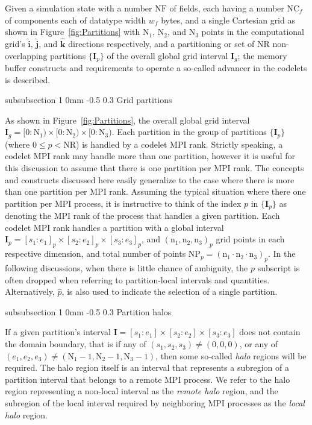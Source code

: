 \documentclass[11pt]{article}
\makeatletter
\renewcommand{\subsubsection}{\@startsection
{subsubsection}%
{1}%
{0mm}%
{-0.5\baselineskip}%
{0.3\baselineskip}%
{\normalfont\normalsize\itshape\centering\color{myBrown}}}%
\makeatother
\begin{document}
Given a simulation state with a number $\text{NF}$ of fields, each having a number $\text{NC}_f$ of components each of datatype width $w_f$ bytes, and a single Cartesian grid as shown in Figure~\ref{fig:Partitions} with $\text{N}_1$, $\text{N}_2$, and $\text{N}_3$ points in the computational grid's $\mathbf{\hat{i}}$, $\mathbf{\hat{j}}$, and $\mathbf{\hat{k}}$ directions respectively, and a partitioning or set of $\text{NR}$ non-overlapping partitions $\{\textbf{I}_p\}$ of the overall global grid interval $\textbf{I}_{g}$; the memory buffer constructs and requirements to operate a so-called advancer in the codelets is described. 

\subsubsection{Grid partitions}

As shown in Figure~\ref{fig:Partitions}, the overall global grid interval $\textbf{I}_{g} = [0:\text{N}_1)\times[0:\text{N}_2)\times[0:\text{N}_3)$. Each partition in the group of partitions $\{\textbf{I}_p\}$ (where $0 \leq p < \text{NR}$) is handled by a codelet MPI rank. Strictly speaking, a codelet MPI rank may handle more than one partition, however it is useful for this discussion to assume that there is one partition per MPI rank. The concepts and constructs discussed here easily generalize to the case where there is more than one partition per MPI rank. Assuming the typical situation where there one partition per MPI process, it is instructive to think of the index $p$ in $\{\textbf{I}_p\}$ as denoting the MPI rank of the process that handles a given partition.  Each codelet MPI rank handles a partition with a global interval $\textbf{I}_p = [s_1:e_1]_p\times[s_2:e_2]_p\times[s_3:e_3]_p$, and $(\text{n}_1,\text{n}_2,\text{n}_3)_p$ grid points in each respective dimension, and total number of points $\text{NP}_p = (\text{n}_1 \cdot \text{n}_2 \cdot \text{n}_3)_p$. In the following discussions, when there is little chance of ambiguity, the $p$ subscript is often dropped when referring to partition-local intervals and quantities. Alternatively, $\hat{p}$, is also used to indicate the selection of a single partition.

\subsubsection{Partition halos}

If a given partition's interval $\textbf{I} = [s_1:e_1]\times[s_2:e_2]\times[s_3:e_3]$ does not contain the domain boundary, that is if any of $(s_1,s_2,s_3) \neq (0,0,0)$, or any of $(e_1,e_2,e_3) \neq (\text{N}_1-1,\text{N}_2-1,\text{N}_3-1)$, then some so-called \textit{halo} regions will be required. The halo region itself is an interval that represents a subregion of a partition interval that belongs to a remote MPI process. We refer to the halo region representing a non-local interval as the \textit{remote halo} region, and the subregion of the local interval required by neighboring MPI processes as the \textit{local halo} region.
\end{document}
